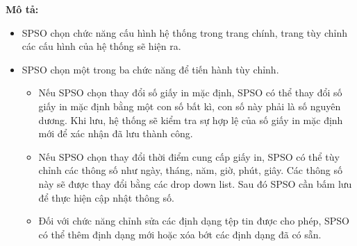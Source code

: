     \newpage
    \textbf{Mô tả:}
    \begin{itemize}
        \item SPSO chọn chức năng cấu hình hệ thống trong trang chính, trang tùy chỉnh các cấu hình của hệ thống sẽ hiện ra.\\
        \item SPSO chọn một trong ba chức năng để tiến hành tùy chỉnh.\\
        \begin{itemize}
            \item Nếu SPSO chọn thay đổi số giấy in mặc định, SPSO có thể thay đổi số giấy in mặc định bằng một con số bất kì, con số này phải là số nguyên dương. Khi lưu, hệ thống sẽ kiểm tra sự hợp lệ của số giấy in mặc định mới để xác nhận đã lưu thành công.\\
            \item Nếu SPSO chọn thay đổi thời điểm cung cấp giấy in, SPSO có thể tùy chỉnh các thông số như ngày, tháng, năm, giờ, phút, giây. Các thông số này sẽ được thay đổi bằng các drop down list. Sau đó SPSO cần bấm lưu để thực hiện cập nhật thông số.
            \item Đối với chức năng chỉnh sửa các định dạng tệp tin được cho phép, SPSO có thể thêm định dạng mới hoặc xóa bớt các định dạng đã có sẵn.
        \end{itemize}
    \end{itemize}


    \newpage
